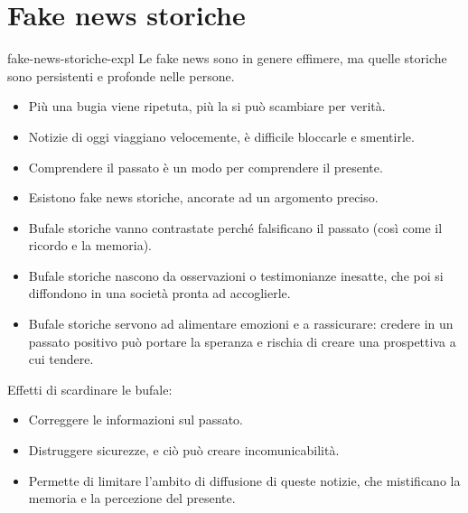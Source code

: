 \documentclass[preview]{standalone}
\begin{document}
\genpage

\section{Fake news storiche}


\begin{snippet}{fake-news-storiche-expl}
    Le fake news sono in genere effimere, ma quelle storiche sono persistenti e
    profonde nelle persone.

    \begin{itemize}
        \item Più una bugia viene ripetuta, più la si può scambiare per verità.
        \item Notizie di oggi viaggiano velocemente, è difficile bloccarle e smentirle.
        \item Comprendere il passato è un modo per comprendere il presente.
        \item Esistono fake news storiche, ancorate ad un argomento preciso.
        \item Bufale storiche vanno contrastate perché falsificano il passato (così come il ricordo e la memoria).
        \item Bufale storiche nascono da osservazioni o testimonianze inesatte, che poi si diffondono in una società pronta ad accoglierle.
        \item Bufale storiche servono ad alimentare emozioni e a rassicurare: credere in un passato positivo può portare la speranza e rischia di creare una prospettiva a cui tendere.
    \end{itemize}

    Effetti di scardinare le bufale:

    \begin{itemize}
        \item Correggere le informazioni sul passato.
        \item Distruggere sicurezze, e ciò può creare incomunicabilità.
        \item Permette di limitare l'ambito di diffusione di queste notizie, che mistificano la memoria e la percezione del presente.
    \end{itemize}
\end{snippet}
\end{document}
